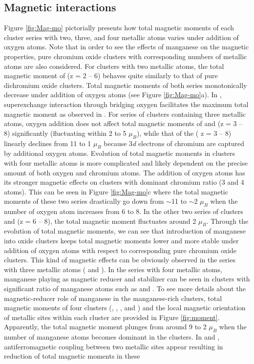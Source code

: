 \begin{refsection}
\subsection{Magnetic interactions}


Figure \ref{fig:Mag-mo} pictorially presents how total magnetic moments of each cluster series with two, three, and four metallic atoms varies under addition of oxygen atoms. Note that in order to see the effects of manganese on the magnetic properties, pure chromium oxide clusters with corresponding numbers of metallic atoms are also considered. For clusters with two metallic atoms, the total magnetic moment of  (z = 2 -- 6) behaves quite similarly to that of pure dichromium oxide clusters. Total magnetic moments of both series monotonically decrease under addition of oxygen atoms (see Figure \ref{fig:Mag-mo}a). In , superexchange interaction through bridging oxygen facilitates the maximum total magnetic moment as observed in . \cite{Tono2003B, Nhan-Cr2O2, Nhan18} For series of clusters containing three metallic atoms,  oxygen addition does not affect total magnetic moments of  and  (z = 3 -- 8) significantly (fluctuating within 2 to 5 $\mu_B$), while that of the  ( z = 3 -- 8) linearly declines from 11 to 1 $\mu_B$ because 3\textit{d} electrons of chromium are captured by additional oxygen atoms. \cite{Nhan18} Evolution of total magnetic moments in clusters with four metallic atoms is more complicated and likely dependent on the precise amount of both oxygen and chromium atoms. The addition of oxygen atoms has its stronger magnetic effects on clusters with dominant chromium ratio (3 and 4 atoms). This can be seen in Figure \ref{fig:Mag-mo}c where the total magnetic moments of these two series drastically go down from $\sim$11 to $\sim$2 $\mu_B$ when the number of oxygen atom increases from 6 to 8. In the other two series of clusters  and  (z = 6 -- 8), the total magnetic moment fluctuates around 2 $\mu_B$. Through the evolution of total magnetic moments, we can see that introduction of manganese into oxide clusters keeps total magnetic moments lower and more stable under addition of oxygen atoms with respect to corresponding pure chromium oxide clusters. This kind of magnetic effects can be obviously observed in the series with three metallic atoms ( and ). In the series with four metallic atoms, manganese playing as magnetic reducer and stabilizer can be seen in clusters with significant ratio of manganese atoms such as  and . To see more details about the magnetic-reducer role of manganese in the manganese-rich clusters, total magnetic moments of four clusters (, , , and ) and the local magnetic orientation of metallic sites within each cluster are provided in Figure \ref{fig:moment}. Apparently, the total magnetic moment plunges from around 9 to 2 $\mu_B$ when the number of manganese atoms becomes dominant in the clusters. In  and , antiferromagnetic coupling between two metallic sites appear resulting in reduction of total magnetic moments in these 
\end{refsection}

